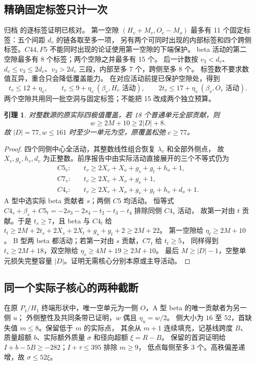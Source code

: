 \documentclass[11pt,a4paper]{article}
\newtheorem{lemma}[theorem]{引理}
\begin{document}
\subsection*{精确固定标签只计一次}
归档  的逐标签证明已核对。
第一空隙 $(H_v+M_v,O_v-M_o)$ 最多有 11 个固定标签：五个间距 $d_v$ 的链各取至多一项，
另有两个可同时出现的内部标签和四个跨侧标签。$C44,F5$ 不能同时出现的论证使用第一空隙的下端保护。
beta 活动的第二空隙最多有 8 个标签；两个空隙之并最多有 15 个。
后一计数按 $v_3<d_v$、$d_v\le v_3\le2d_v$、$v_3>2d_v$ 三段，内部至多 7 个，跨侧至多 8 个。
标签数不要求数值互异，重合只会降低覆盖能力。
在对应活动前提已保护空隙处，得到
\[
t_v\le12+\eta_v,\qquad
t_v\le9+\eta_v\ (\beta_v,H_v\text{ 活动}),\qquad
2t_v\le17+\eta_v\ (\beta_v,O_v\text{ 活动}).
\]
两个空隙共用同一批空洞与固定标签；不能把 15 改成两个独立预算。

\begin{lemma}\label{lem:noempty}
对整数源的原实际四极值覆盖，若 18 个普通单元全部贡献，则
\[w\ge2M+10\ge2|D|+8.\]
故 $|D|=77,w\le161$ 时至少一单元为空，原覆盖松弛 $c\ge77$。
\end{lemma}
\begin{proof}
四个同侧中心全活动，其整数线性组合恢复 $\lambda_v$ 和全部外侧点，
故 $X_v,g_v,h_v,d_v$ 为正整数。前序报告中由实际活动直接展开的三个不等式仍为
\[
\begin{aligned}
C5_v:&\quad t_v\ge2X_v+X_o+g_s+g_t+h_o+1,\\
C7_v:&\quad t_v\ge2X_v+X_o+g_v+1,\\
C4_v:&\quad t_v\ge2X_v+X_o+g_s+g_t+h_o+d_o+1.
\end{aligned}
\]
A 型中选实际 beta 贡献者 $s$；两侧 $C5$ 均活动。
恒等式 $C4_s+\beta_s+C5_t=-2s_3-2s_4-t_2-t_3-t_4$ 排除同侧 $C4_s$ 活动，
故第一对由 $t$ 贡献。于是 $t_s\ge7$，且 beta 与 $C4_t$ 给
$t_t\ge2M+2t_s+2X_s+2X_t+g_s+g_t+2\ge2M+22$。
第一空隙给 $\eta_t\ge2M+10$。
B 型两 beta 都活动；若第一对由 $s$ 贡献，$C7_t$ 给 $t_t\ge5$，
同样得到 $t_s\ge2M+18$，双空隙给 $\eta_s\ge4M+19\ge2M+10$。
最后 $M\ge|D|-1$，空整单元损失完整容量 $|D|$。证明无需核心分别本原或主导活动。
\end{proof}

\subsection*{同一个实际子核心的两种截断}
在原 $P_1/H_1$ 终端形状中，唯一空单元为一侧 $O$，A 型 beta 的唯一贡献者为另一侧 $u$；
外侧整性及共同条带已证明，$w$ 偶且 $\eta_u=w/2$。
侧大小为 $16$ 至 $52$，首缺失值 $m\le8$。保留低于 $m$ 的实际点，
其余从 $m+1$ 连续填充，记基线跨度 $B$、质量超额 $b$、实际额外质量 $\sigma$ 和径向超额 $\xi=R-B$。
保留的首洞证明给 $I+b-5B\ge-282$；$I+\tau\le395$ 排除 $m\ge9$，
低点每侧至多 3 个。高秩偏差递增，故 $\sigma\le52\xi$。
\end{document}
